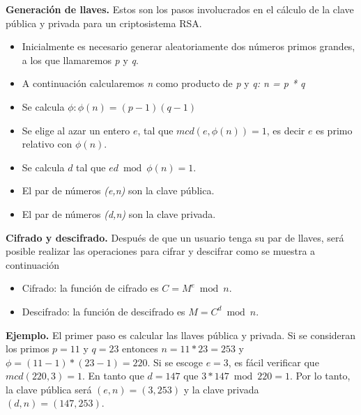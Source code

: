 \textbf{Generación de llaves.} Estos son los pasos involucrados en el cálculo de la clave pública y privada para un criptosistema
RSA. \\
\begin{itemize}
\item Inicialmente es necesario generar aleatoriamente dos números primos grandes, a los que llamaremos \textit{p} y \textit{q}.
\item A continuación calcularemos \textit{n} como producto de \textit{p} y \textit{q: n = p * q}
\item Se calcula \textit{$ \phi : \phi (n)=(p-1)(q-1)$}
\item Se elige al azar un entero $e$, tal que $mcd(e, \phi(n))=1$, es decir $e$ es 
primo relativo con $\phi(n)$. 
\item Se calcula $d$ tal que $ed \bmod \phi (n)=1$. 
\item El par de números \textit{(e,n)} son la clave pública.
\item El par de números \textit{(d,n)} son la clave privada.
\end{itemize} 
\textbf{Cifrado y descifrado.}
Despu\'es de que un usuario tenga su par de llaves, ser\'a posible realizar las operaciones para cifrar y descifrar como se muestra a continuaci\'on


\begin{itemize}
\item Cifrado: la función de cifrado es $C = M^e \bmod n$.

\item Descifrado: la función de descifrado es $M = C^d \bmod n$.
\end{itemize} 
\noindent
{\bf Ejemplo.} El primer paso es calcular las llaves p\'ublica y privada. Si se consideran los primos $p = 11$ y $q = 23$ entonces $n = 11 * 23 = 253$ y $ \phi = ( 11 - 1 ) * ( 23 - 1 ) = 220 $.
\noindent
Si se escoge $e=3$, es f\'acil verificar que $mcd ( 220, 3 ) = 1$. En tanto que $d=147$ 
que $3 * 147 \bmod 220 =1$. Por lo tanto, la clave p\'ublica ser\'a $(e,n) = (3,253)$ y 
la clave privada $(d,n) = (147,253)$.\\ 

